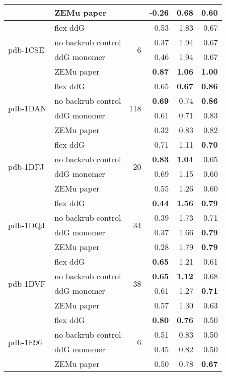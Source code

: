 \begin{table}
\begin{tabular}{llrrrr}
 & ZEMu paper & & -0.26 & 0.68 & 0.60  \\
\hline
 \multirow{ 4}{*}{pdb-1CSE} & flex ddG & \multirow{ 4}{*}{6} & 0.53 & 1.83 & 0.67  \\
 & no backrub control & & 0.37 & 1.94 & 0.67  \\
 & ddG monomer & & 0.46 & 1.94 & 0.67  \\
 & ZEMu paper & & \textbf{0.87} & \textbf{1.06} & \textbf{1.00}  \\
\hline
 \multirow{ 4}{*}{pdb-1DAN} & flex ddG & \multirow{ 4}{*}{118} & 0.65 & \textbf{0.67} & \textbf{0.86}  \\
 & no backrub control & & \textbf{0.69} & 0.74 & \textbf{0.86}  \\
 & ddG monomer & & 0.61 & 0.71 & 0.83  \\
 & ZEMu paper & & 0.32 & 0.83 & 0.82  \\
\hline
 \multirow{ 4}{*}{pdb-1DFJ} & flex ddG & \multirow{ 4}{*}{20} & 0.71 & 1.11 & \textbf{0.70}  \\
 & no backrub control & & \textbf{0.83} & \textbf{1.04} & 0.65  \\
 & ddG monomer & & 0.69 & 1.15 & 0.60  \\
 & ZEMu paper & & 0.55 & 1.26 & 0.60  \\
\hline
 \multirow{ 4}{*}{pdb-1DQJ} & flex ddG & \multirow{ 4}{*}{34} & \textbf{0.44} & \textbf{1.56} & \textbf{0.79}  \\
 & no backrub control & & 0.39 & 1.73 & 0.71  \\
 & ddG monomer & & 0.37 & 1.66 & \textbf{0.79}  \\
 & ZEMu paper & & 0.28 & 1.79 & \textbf{0.79}  \\
\hline
 \multirow{ 4}{*}{pdb-1DVF} & flex ddG & \multirow{ 4}{*}{38} & \textbf{0.65} & 1.21 & 0.61  \\
 & no backrub control & & \textbf{0.65} & \textbf{1.12} & 0.68  \\
 & ddG monomer & & 0.61 & 1.27 & \textbf{0.71}  \\
 & ZEMu paper & & 0.57 & 1.30 & 0.63  \\
\hline
 \multirow{ 4}{*}{pdb-1E96} & flex ddG & \multirow{ 4}{*}{6} & \textbf{0.80} & \textbf{0.76} & 0.50  \\
 & no backrub control & & 0.51 & 0.83 & 0.50  \\
 & ddG monomer & & 0.45 & 0.82 & 0.50  \\
 & ZEMu paper & & 0.50 & 0.78 & \textbf{0.67}  \\
\hline

\end{tabular}
\end{table}
